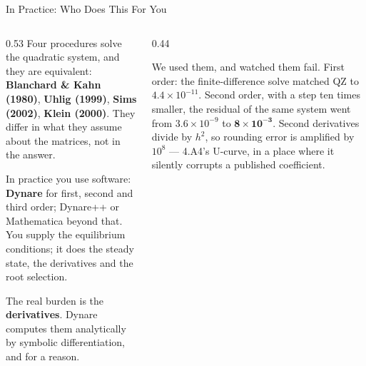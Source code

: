 \begin{frame}{In Practice: Who Does This For You}
\begin{columns}[T]
\begin{column}{0.53\textwidth}
\small
Four procedures solve the quadratic system, and they are equivalent: \textbf{Blanchard \& Kahn (1980)}, \textbf{Uhlig (1999)}, \textbf{Sims (2002)}, \textbf{Klein (2000)}. They differ in what they assume about the matrices, not in the answer.
\medskip

In practice you use software: \textbf{Dynare} for first, second and third order; Dynare++ or Mathematica beyond that. You supply the equilibrium conditions; it does the steady state, the derivatives and the root selection.
\medskip

The real burden is the \textbf{derivatives}. Dynare computes them analytically by symbolic differentiation, and for a reason.
\end{column}
\begin{column}{0.44\textwidth}
\begin{cautionbox}[title=\textbf{Why not numerical derivatives?}]\small
We used them, and watched them fail. First order: the finite-difference solve matched QZ to $4.4\times10^{-11}$. Second order, with a step ten times smaller, the residual of the same system went from $3.6\times10^{-9}$ to $\mathbf{8\times10^{-3}}$.
\medskip
Second derivatives divide by $h^{2}$, so rounding error is amplified by $10^{8}$ --- 4.A4's U-curve, in a place where it silently corrupts a published coefficient.
\end{cautionbox}
\end{column}
\end{columns}
\vspace{1mm}
\end{frame}

